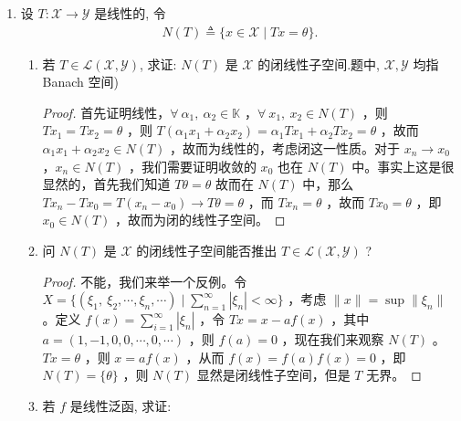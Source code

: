 \begin{enumerate}[leftmargin=2cm, label=\arabic*]
\begin{proof}
    由于 $\|f\| = \sup\limits_{\|x\| = 1}\frac{\|f(x)\|}{\|x\|}$ ，故而 $\forall\ \eta>0$  ，$\exists\ x_1$ ，使得 $\|f\| - \eta < \frac{\|f(x_1)\|}{\|x_1\|}$ 。故而我们有 $\frac{\|x_1\|}{\|f(x_1)\|}\|f\| < \frac{\|f\|}{\|f\| - \eta}$ ，取 $\eta = \frac{1}{1+\varepsilon}\|f\|$ 即得 $\frac{\|x_1\|}{\|f(x_1)\|} \|f\| < 1 + \varepsilon$ ，令 $x_0 = \frac{x_1}{f(x_1)}\|f\|$ ，则 $f(x_0) = \|f\|$ 且 $\|x_0\| = \frac{\|x_1\|}{\|f(x_1)\|}\|f\| < 1+ \varepsilon$ 。
\end{proof}
    \item 设 $T: \mathscr{X} \rightarrow \mathscr{Y}$ 是线性的, 令
    \begin{align*}
        N(T) \triangleq\{x \in \mathscr{X} \mid T x=\theta\} .
    \end{align*}
    \begin{enumerate}[leftmargin=1cm, label=(\arabic*)]
        \item 若 $T \in \mathscr{L}(\mathscr{X}, \mathscr{Y})$, 求证: $N(T)$ 是 $\mathscr{X}$ 的闭线性子空间.题中, $\mathscr{X}, \mathscr{Y}$ 均指 Banach 空间)
\begin{proof}
    首先证明线性，$\forall\ \alpha_1,\ \alpha_2\in \mathbb{K}$ ，$\forall\ x_1,\ x_2\in N(T)$ ，则 $Tx_1 = Tx_2 = \theta$ ，则 $T(\alpha_1x_1 + \alpha_2x_2) = \alpha_1Tx_1 + \alpha_2Tx_2 = \theta$ ，故而 $\alpha_1x_1 + \alpha_2x_2\in N(T)$ ，故而为线性的，考虑闭这一性质。对于 $x_n\to x_0$ ，$x_n\in N(T)$ ，我们需要证明收敛的 $x_0$ 也在 $N(T)$ 中。事实上这是很显然的，首先我们知道 $T\theta = \theta$ 故而在 $N(T)$ 中，那么 $Tx_n - Tx_0 = T(x_n-x_0)\to T\theta = \theta$ ，而 $Tx_n = \theta$ ，故而 $Tx_0 = \theta$ ，即 $x_0\in N(T)$ ，故而为闭的线性子空间。 
\end{proof}
        \item 问 $N(T)$ 是 $\mathscr{X}$ 的闭线性子空间能否推出 $T \in \mathscr{L}(\mathscr{X}, \mathscr{Y})$ ?
\begin{proof}
    不能，我们来举一个反例。令 $X = \{(\xi_1,\ \xi_2,\cdots, \xi_n, \cdots)\mid \sum\limits_{n=1}^{\infty} |\xi_n | < \infty\}$ ，考虑 $\|x\| = \sup\|\xi_n\|$ 。定义 $f(x) = \sum\limits_{i=1}^{\infty} |\xi_n|$ ，令 $Tx = x - a f(x)$ ，其中 $a = (1, -1, 0, 0, \cdots, 0, \cdots)$ ，则 $f(a) = 0$ ，现在我们来观察 $N(T)$ 。$Tx = \theta$ ，则 $x = af(x)$ ，从而 $f(x) = f(a)f(x) = 0$ ，即 $N(T) = \{\theta\}$ ，则 $N(T)$ 显然是闭线性子空间，但是 $T$ 无界。  
\end{proof}
        \item 若 $f$ 是线性泛函, 求证:

\end{enumerate}
\end{enumerate}
